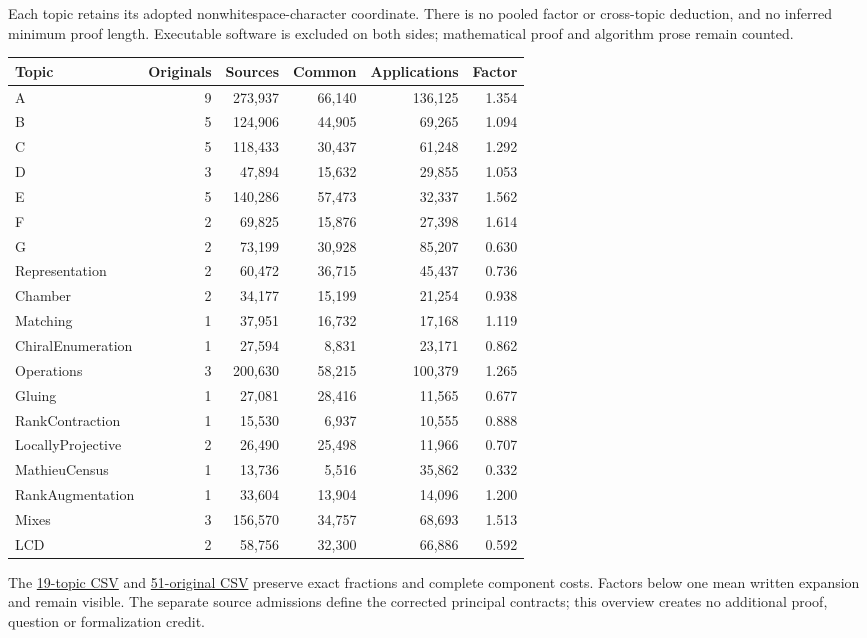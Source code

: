 \documentclass[11pt,a4paper]{article}
\begin{document}
Each topic retains its adopted nonwhitespace-character coordinate. There is no pooled factor or cross-topic deduction, and no inferred minimum proof length. Executable software is excluded on both sides; mathematical proof and algorithm prose remain counted.
\begin{center}\small\begin{tabular}{lrrrrr}\toprule
Topic & Originals & Sources & Common & Applications & Factor\\\midrule
A & 9 & 273,937 & 66,140 & 136,125 & 1.354 \\
B & 5 & 124,906 & 44,905 & 69,265 & 1.094 \\
C & 5 & 118,433 & 30,437 & 61,248 & 1.292 \\
D & 3 & 47,894 & 15,632 & 29,855 & 1.053 \\
E & 5 & 140,286 & 57,473 & 32,337 & 1.562 \\
F & 2 & 69,825 & 15,876 & 27,398 & 1.614 \\
G & 2 & 73,199 & 30,928 & 85,207 & 0.630 \\
Representation & 2 & 60,472 & 36,715 & 45,437 & 0.736 \\
Chamber & 2 & 34,177 & 15,199 & 21,254 & 0.938 \\
Matching & 1 & 37,951 & 16,732 & 17,168 & 1.119 \\
ChiralEnumeration & 1 & 27,594 & 8,831 & 23,171 & 0.862 \\
Operations & 3 & 200,630 & 58,215 & 100,379 & 1.265 \\
Gluing & 1 & 27,081 & 28,416 & 11,565 & 0.677 \\
RankContraction & 1 & 15,530 & 6,937 & 10,555 & 0.888 \\
LocallyProjective & 2 & 26,490 & 25,498 & 11,966 & 0.707 \\
MathieuCensus & 1 & 13,736 & 5,516 & 35,862 & 0.332 \\
RankAugmentation & 1 & 33,604 & 13,904 & 14,096 & 1.200 \\
Mixes & 3 & 156,570 & 34,757 & 68,693 & 1.513 \\
LCD & 2 & 58,756 & 32,300 & 66,886 & 0.592 \\
\bottomrule\end{tabular}\end{center}
The \href{topics.csv}{19-topic CSV} and \href{applications.csv}{51-original CSV} preserve exact fractions and complete component costs. Factors below one mean written expansion and remain visible. The separate source admissions define the corrected principal contracts; this overview creates no additional proof, question or formalization credit.
\newpage
\end{document}
